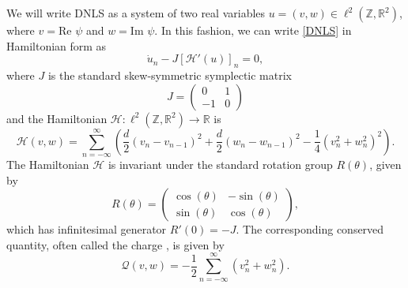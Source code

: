 \documentclass[12pt]{elsarticle}
\def\R{{\mathbb R}}
\def\Z{{\mathbb Z}}
\begin{document}
We will write DNLS as a system of two real variables $u = (v, w) \in \ell^2(\Z, \R^2)$, where $v = \text{Re }\psi$ and $w = \text{Im }\psi$. In this fashion, we can write \cref{DNLS} in Hamiltonian form as
\begin{equation}\label{DNLSrealHam}
\dot{u}_n - J [\mathcal{H}'(u)]_n = 0,
\end{equation}
where $J$ is the standard skew-symmetric symplectic matrix
\[
J = \begin{pmatrix}0 & 1 \\ -1 & 0\end{pmatrix}
\]
and the Hamiltonian $\mathcal{H}: \ell^2(\Z,\R^2) \rightarrow \R$ is
\begin{equation}\label{DNLSrealH}
\mathcal{H}(v, w) = \sum_{n = -\infty}^\infty 
\left( \frac{d}{2}\left(v_n - v_{n-1}\right)^2 + \frac{d}{2}\left(w_n - w_{n-1}\right)^2 - \frac{1}{4}\left( v_n^2 + w_n^2 \right)^2 \right).
\end{equation}
The Hamiltonian $\mathcal{H}$ is invariant under the standard rotation group $R(\theta)$, given by
\begin{equation}\label{Rtheta}
R(\theta) = \begin{pmatrix}
\cos(\theta) & -\sin(\theta) \\
\sin(\theta)& \cos(\theta)
\end{pmatrix},
\end{equation}
which has infinitesimal generator $R'(0) = -J$. The corresponding conserved quantity, often called the charge \cite[Section 6.C]{Grillakis1987}, is given by
\begin{equation}\label{DNLSQ}
\mathcal{Q}(v, w) = -\frac{1}{2} \sum_{n = -\infty}^\infty 
\left( v_n^2 + w_n ^2\right).
\end{equation}
\end{document}
